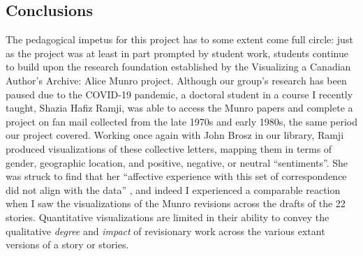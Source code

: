 \documentclass{article}
\begin{document}
\subsection*{Conclusions}

The pedagogical impetus for this project has to some extent come full
circle: just as the project was at least in part prompted by student
work, students continue to build upon the research foundation
established by the Visualizing a Canadian Author's Archive: Alice Munro
project. Although our group's research has been paused due to the
COVID-19 pandemic, a doctoral student in a course I recently taught,
Shazia Hafiz Ramji, was able to access the Munro papers and complete a
project on fan mail collected from the late 1970s and early 1980s, the
same period our project covered. Working once again with John Brosz in
our library, Ramji produced visualizations of these collective letters,
mapping them in terms of gender, geographic location, and positive,
negative, or neutral ``sentiments''. She was struck to find that her
``affective experience with this set of correspondence did not align
with the data'' \citep[3]{ramji_dear_2022}, and indeed I experienced a comparable
reaction when I saw the visualizations of the Munro revisions across the
drafts of the 22 stories. Quantitative visualizations are limited in
their ability to convey the qualitative \emph{degree} and \emph{impact}
of revisionary work across the various extant versions of a story or
stories.
\end{document}

